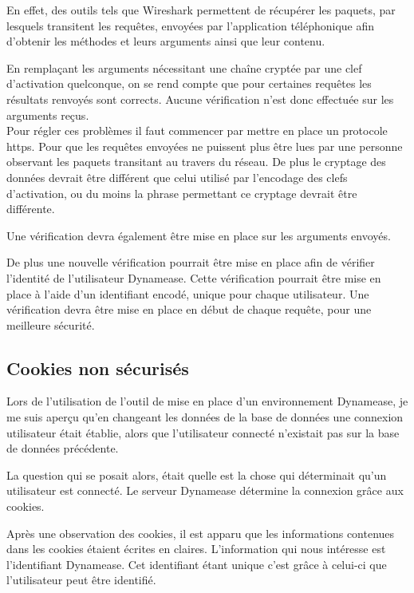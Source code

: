 En effet, des outils tels que Wireshark permettent de récupérer les paquets, par lesquels transitent les requêtes, envoyées par l'application téléphonique afin d'obtenir les méthodes et leurs arguments ainsi que leur contenu.

En remplaçant les arguments nécessitant une chaîne cryptée par une clef d'activation quelconque, on se rend compte que pour certaines requêtes les résultats renvoyés sont corrects. Aucune vérification n'est donc effectuée sur les arguments reçus.\\

Pour régler ces problèmes il faut commencer par mettre en place un protocole https. Pour que les requêtes envoyées ne puissent plus être lues par une personne observant les paquets transitant au travers du réseau. De plus le cryptage des données devrait être différent que celui utilisé par l'encodage des clefs d'activation, ou du moins la phrase permettant ce cryptage devrait être différente.

Une vérification devra également être mise en place sur les arguments envoyés.

De plus une nouvelle vérification pourrait être mise en place afin de vérifier l'identité de l'utilisateur Dynamease. Cette vérification pourrait être mise en place à l'aide d'un identifiant encodé, unique pour chaque utilisateur. Une vérification devra être mise en place en début de chaque requête, pour une meilleure sécurité.

\subsection{Cookies non sécurisés}

Lors de l'utilisation de l'outil de mise en place d'un environnement Dynamease, je me suis aperçu qu'en changeant les données de la base de données une connexion utilisateur était établie, alors que l'utilisateur connecté n'existait pas sur la base de données précédente.

La question qui se posait alors, était quelle est la chose qui déterminait qu'un utilisateur est connecté. Le serveur Dynamease détermine la connexion grâce aux cookies.

Après une observation des cookies, il est apparu que les informations contenues dans les cookies étaient écrites en claires. L'information qui nous intéresse est l'identifiant Dynamease. Cet identifiant étant unique c'est grâce à celui-ci que l'utilisateur peut être identifié.

